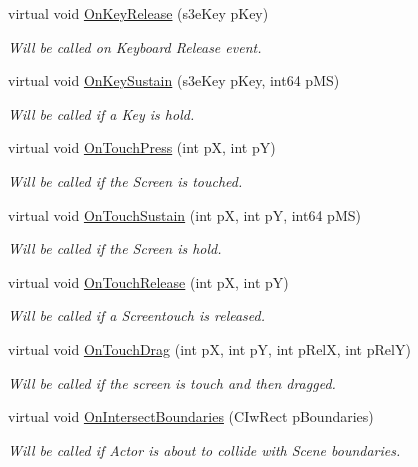 \begin{DoxyCompactItemize}
virtual void \hyperlink{class_i_ty_actor_ae0402203392a84e769fad4a989d07b3c}{OnKeyRelease} (s3eKey pKey)
\begin{DoxyCompactList}\small\item\em Will be called on Keyboard Release event. \end{DoxyCompactList}\item 
virtual void \hyperlink{class_i_ty_actor_aa6008d50671f63f7ca482b54179b7725}{OnKeySustain} (s3eKey pKey, int64 pMS)
\begin{DoxyCompactList}\small\item\em Will be called if a Key is hold. \end{DoxyCompactList}\item 
virtual void \hyperlink{class_i_ty_actor_ae828745012aac359147920ccb42801b9}{OnTouchPress} (int pX, int pY)
\begin{DoxyCompactList}\small\item\em Will be called if the Screen is touched. \end{DoxyCompactList}\item 
virtual void \hyperlink{class_i_ty_actor_adb1cde3971b3d75407a8fbb590f7088a}{OnTouchSustain} (int pX, int pY, int64 pMS)
\begin{DoxyCompactList}\small\item\em Will be called if the Screen is hold. \end{DoxyCompactList}\item 
virtual void \hyperlink{class_i_ty_actor_a240c68f34a3b90af8bbef1729a74114a}{OnTouchRelease} (int pX, int pY)
\begin{DoxyCompactList}\small\item\em Will be called if a Screentouch is released. \end{DoxyCompactList}\item 
virtual void \hyperlink{class_i_ty_actor_ad07610fc8cd2e0ade09d777979102a22}{OnTouchDrag} (int pX, int pY, int pRelX, int pRelY)
\begin{DoxyCompactList}\small\item\em Will be called if the screen is touch and then dragged. \end{DoxyCompactList}\item 
virtual void \hyperlink{class_i_ty_actor_a9da03663a14f091ce23a5adae98e2302}{OnIntersectBoundaries} (CIwRect pBoundaries)
\begin{DoxyCompactList}\small\item\em Will be called if Actor is about to collide with Scene boundaries. \end{DoxyCompactList}\item 

\end{DoxyCompactItemize}
